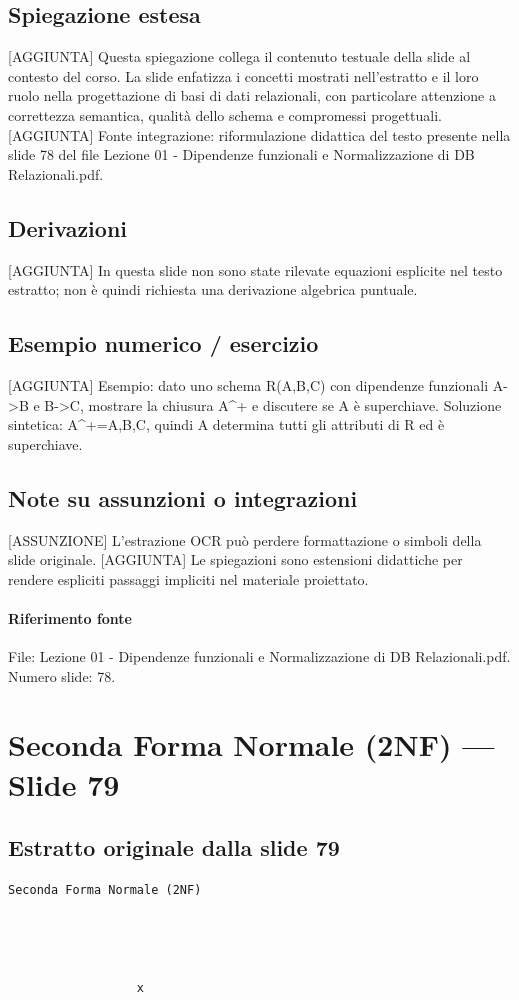 \documentclass[11pt]{article}
\begin{document}
\subsection*{Spiegazione estesa}
[AGGIUNTA] Questa spiegazione collega il contenuto testuale della slide al contesto del corso. La slide enfatizza i concetti mostrati nell'estratto e il loro ruolo nella progettazione di basi di dati relazionali, con particolare attenzione a correttezza semantica, qualità dello schema e compromessi progettuali.
[AGGIUNTA] Fonte integrazione: riformulazione didattica del testo presente nella slide 78 del file Lezione 01 - Dipendenze funzionali e Normalizzazione di DB Relazionali.pdf.
\subsection*{Derivazioni}
[AGGIUNTA] In questa slide non sono state rilevate equazioni esplicite nel testo estratto; non è quindi richiesta una derivazione algebrica puntuale.
\subsection*{Esempio numerico / esercizio}
[AGGIUNTA] Esempio: dato uno schema R(A,B,C) con dipendenze funzionali A->B e B->C, mostrare la chiusura A^+ e discutere se A è superchiave. Soluzione sintetica: A^+={A,B,C}, quindi A determina tutti gli attributi di R ed è superchiave.
\subsection*{Note su assunzioni o integrazioni}
[ASSUNZIONE] L'estrazione OCR può perdere formattazione o simboli della slide originale.
[AGGIUNTA] Le spiegazioni sono estensioni didattiche per rendere espliciti passaggi impliciti nel materiale proiettato.
\paragraph{Riferimento fonte} File: Lezione 01 - Dipendenze funzionali e Normalizzazione di DB Relazionali.pdf. Numero slide: 78.
\section{Seconda Forma Normale (2NF) --- Slide 79}
\subsection*{Estratto originale dalla slide 79}
\begin{lstlisting}
Seconda Forma Normale (2NF)




                  x
\end{lstlisting}
\end{document}
